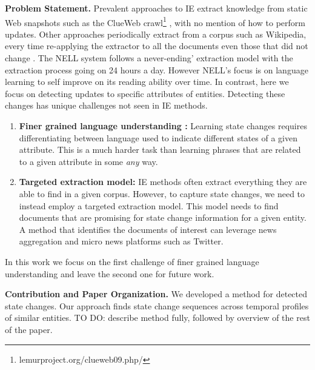 \documentclass[11pt,a4paper]{article}
\renewcommand{\paragraph}[1]{\noindent\textbf{#1.}}
\newcommand{\highlight}[1]{{\color{red} #1}}
\begin{document}
\paragraph{Problem Statement} 
Prevalent approaches to IE extract knowledge from static Web snapshots such as the  ClueWeb crawl\footnote{lemurproject.org/clueweb09.php/} \cite{Fader11,Nakashole11}, with no mention of how to perform updates. Other approaches periodically extract from a corpus such as Wikipedia, every time re-applying the extractor to all the documents even those that did not change \cite{Suchanek07}.  The NELL system \cite{Carlson10} follows a never-ending' extraction model with the extraction process going on 24 hours a day. However NELL's focus is on language learning  to self improve on its reading ability over time. In contrast, here we focus on  detecting  updates to specific attributes of entities.  Detecting these changes has unique   challenges not seen in IE methods.
\begin{enumerate}
\item \textbf{Finer grained language understanding :}   Learning state changes requires differentiating between language used to indicate different states of a given attribute. This is a much harder task than learning phrases that are related to a given attribute in some \textit{any} way.

\item \textbf{Targeted extraction model:}  IE methods often  extract everything they are able to find in a given corpus. However, to capture state changes, we need to instead employ a targeted extraction model. This model needs to find documents that  are promising for state change information for a given entity. A method that identifies the documents of interest can leverage  news aggregation and micro news platforms such as Twitter.
\end{enumerate}

In this work we focus on the first challenge of finer grained language understanding and leave the second one for future work.

\paragraph{Contribution  and Paper Organization} 
We developed a method for detected state changes. Our approach finds  state change sequences across temporal profiles of similar entities. \highlight{TO DO: describe method fully, followed by overview of the rest of the paper.}
\end{document}
